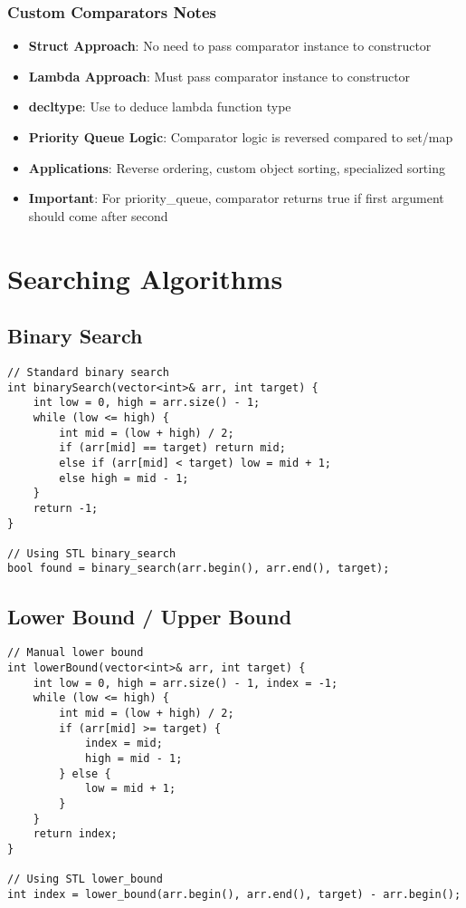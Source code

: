 \documentclass[11pt,a4paper]{article}
\begin{document}
\subsubsection*{Custom Comparators Notes}
\begin{itemize}
\item \textbf{Struct Approach}: No need to pass comparator instance to constructor
\item \textbf{Lambda Approach}: Must pass comparator instance to constructor
\item \textbf{decltype}: Use to deduce lambda function type
\item \textbf{Priority Queue Logic}: Comparator logic is reversed compared to set/map
\item \textbf{Applications}: Reverse ordering, custom object sorting, specialized sorting
\item \textbf{Important}: For priority\_queue, comparator returns true if first argument should come after second
\end{itemize}

\newpage
\section{Searching Algorithms}

\subsection{Binary Search}
\begin{lstlisting}[caption={Binary Search Implementation}]
// Standard binary search
int binarySearch(vector<int>& arr, int target) {
    int low = 0, high = arr.size() - 1;
    while (low <= high) {
        int mid = (low + high) / 2;
        if (arr[mid] == target) return mid;
        else if (arr[mid] < target) low = mid + 1;
        else high = mid - 1;
    }
    return -1;
}

// Using STL binary_search
bool found = binary_search(arr.begin(), arr.end(), target);
\end{lstlisting}

\subsection{Lower Bound / Upper Bound}
\begin{lstlisting}[caption={Lower Bound Implementation}]
// Manual lower bound
int lowerBound(vector<int>& arr, int target) {
    int low = 0, high = arr.size() - 1, index = -1;
    while (low <= high) {
        int mid = (low + high) / 2;
        if (arr[mid] >= target) {
            index = mid;
            high = mid - 1;
        } else {
            low = mid + 1;
        }
    }
    return index;
}

// Using STL lower_bound
int index = lower_bound(arr.begin(), arr.end(), target) - arr.begin();
\end{lstlisting}
\end{document}
